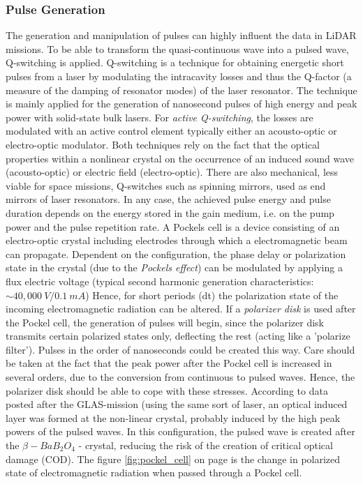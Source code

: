 \subsubsection{Pulse Generation}
\label{pockel}
The generation and manipulation of pulses can highly influent the data in \acs{LiDAR} missions. To be able to transform the quasi-continuous wave into a pulsed wave, Q-switching is applied. Q-switching is a technique for obtaining energetic short pulses from a \acs{laser} by modulating the intracavity losses and thus the Q-factor (a measure of the damping of resonator modes) of the laser resonator. The technique is mainly applied for the generation of nanosecond pulses of high energy and peak power with solid-state bulk lasers. For \textit{active Q-switching}, the losses are modulated with an active control element typically either an acousto-optic or electro-optic modulator. Both techniques rely on the fact that the optical properties within a nonlinear crystal on the occurrence of an induced sound wave (acousto-optic) or electric field (electro-optic). There are also mechanical, less viable for space missions, Q-switches such as spinning mirrors, used as end mirrors of laser resonators. In any case, the achieved pulse energy and pulse duration depends on the energy stored in the gain medium, i.e. on the pump power and the pulse repetition rate.  A Pockels cell is a device consisting of an electro-optic crystal including electrodes through which a electromagnetic beam can propagate. Dependent on the configuration, the phase delay or polarization state in the crystal (due to the \textit{Pockels effect}) can be modulated by applying a flux electric voltage (typical second harmonic generation characteristics: $\sim40,000\ V / 0.1\ mA$)  Hence, for short periods (dt) the polarization state of the incoming electromagnetic radiation can be altered. If a \textit{polarizer disk} is used after the Pockel cell, the generation of pulses will begin, since the polarizer disk transmits certain polarized states only, deflecting the rest (acting like a 'polarize filter'). Pulses in the order of nanoseconds could be created this way. Care should be taken at the fact that the peak power after the Pockel cell is increased in several orders, due to the conversion from continuous to pulsed waves. Hence, the polarizer disk should be able to cope with these stresses. According to data posted after the GLAS-mission (using the same sort of \acs{laser}, an optical induced layer was formed at the non-linear crystal, probably induced by the high peak powers of the pulsed waves. In this configuration, the pulsed wave is created after the $\beta-BaB_{2}O_{4}$ - crystal, reducing the risk of the creation of critical optical damage (COD). The figure \ref{fig:pockel_cell} on page \pageref{fig:pockel_cell} is the change in polarized state of electromagnetic radiation when passed through a Pockel cell.

